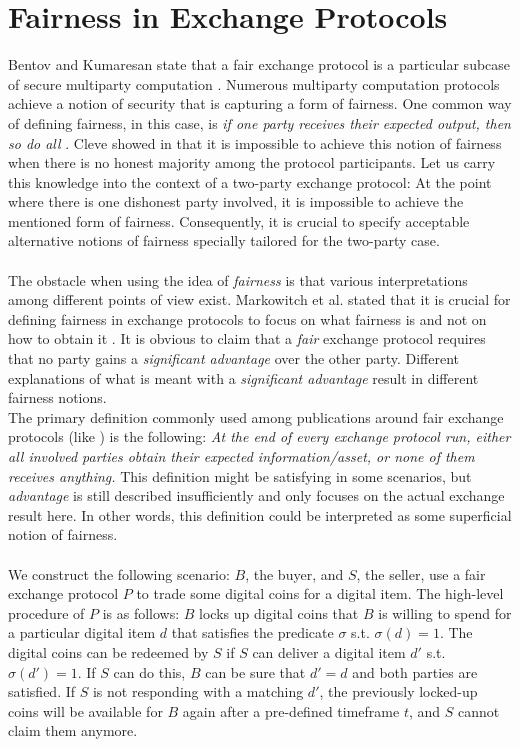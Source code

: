 \documentclass{cacthesis}
\newcounter{protocol}
\begin{document}
    \chapter{Fairness in Exchange Protocols}
        Bentov and Kumaresan state that a fair exchange protocol is a particular subcase of secure multiparty computation \cite{10.1007/978-3-662-44381-1_24}. Numerous multiparty computation protocols achieve a notion of security that is capturing a form of fairness. One common way of defining fairness, in this case, is \textit{if one party receives their expected output, then so do all} \cite{10.1007/978-3-540-79263-5_8}. Cleve showed in \cite{10.1145/12130.12168} that it is impossible to achieve this notion of fairness when there is no honest majority among the protocol participants. Let us carry this knowledge into the context of a two-party exchange protocol: At the point where there is one dishonest party involved, it is impossible to achieve the mentioned form of fairness. Consequently, it is crucial to specify acceptable alternative notions of fairness specially tailored for the two-party case.   \\\\
        The obstacle when using the idea of \textit{fairness} is that various interpretations among different points of view exist. Markowitch et al. stated that it is crucial for defining fairness in exchange protocols to focus on what fairness is and not on how to obtain it \cite{10.1007/3-540-36552-4_31}. It is obvious to claim that a \textit{fair} exchange protocol requires that no party gains a \textit{significant advantage} over the other party. Different explanations of what is meant with a \textit{significant advantage} result in different fairness notions. \\
        The primary definition commonly used among publications around fair exchange protocols (like \cite{10.1145/266420.266426} \cite{asyncOptiFairEx1998} \cite{remarksOnFairEx2000})  is the following: \textit{At the end of every exchange protocol run, either all involved parties obtain their expected information/asset, or none of them receives anything.} This definition might be satisfying in some scenarios, but \textit{advantage} is still described insufficiently and only focuses on the actual exchange result here. In other words, this definition could be interpreted as some superficial notion of fairness. \\\\
        We construct the following scenario: $B$, the buyer, and $S$, the seller, use a fair exchange protocol $P$ to trade some digital coins for a digital item. The high-level procedure of $P$ is as follows: $B$ locks up digital coins that $B$ is willing to spend for a particular digital item $d$ that satisfies the predicate $\sigma$ s.t. $\sigma\left( d\right) =1$. The digital coins can be redeemed by $S$ if $S$ can deliver a digital item $d'$ s.t. $\sigma\left( d'\right) =1$. If $S$ can do this, $B$ can be sure that $d' = d$ and both parties are satisfied. If $S$ is not responding with a matching $d'$, the previously locked-up coins will be available for $B$ again after a pre-defined timeframe $t$, and $S$ cannot claim them anymore. \\
\end{document}
